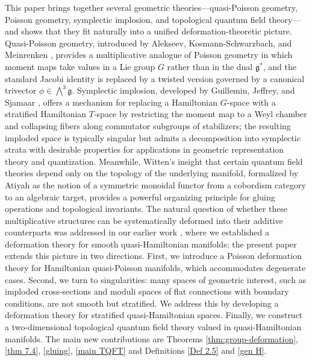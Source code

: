 \documentclass[reqno]{amsart}
\theoremstyle{plain}
\theoremstyle{definition}
\newcommand{\g}{\mathfrak{g}}
\begin{document}
This paper brings together several geometric theories---quasi-Poisson geometry, Poisson geometry, symplectic implosion, and topological quantum field theory---and shows that they fit naturally into a unified deformation-theoretic picture. Quasi-Poisson geometry, introduced by Alekseev, Kosmann-Schwarzbach, and Meinrenken \cite{alekseev2002quasi}, provides a multiplicative analogue of Poisson geometry in which moment maps take values in a Lie group $G$ rather than in the dual $\g^*$, and the standard Jacobi identity is replaced by a twisted version governed by a canonical trivector $\phi \in \bigwedge^3 \g$. Symplectic implosion, developed by Guillemin, Jeffrey, and Sjamaar \cite{guillemin2002}, offers a mechanism for replacing a Hamiltonian $G$-space with a stratified Hamiltonian $T$-space by restricting the moment map to a Weyl chamber and collapsing fibers along commutator subgroups of stabilizers; the resulting imploded space is typically singular but admits a decomposition into symplectic strata with desirable properties for applications in geometric representation theory and quantization. Meanwhile, Witten's insight \cite{witten1988} that certain quantum field theories depend only on the topology of the underlying manifold, formalized by Atiyah \cite{atiyah1988} as the notion of a symmetric monoidal functor from a cobordism category to an algebraic target, provides a powerful organizing principle for gluing operations and topological invariants. The natural question of whether these multiplicative structures can be systematically deformed into their additive counterparts was addressed in our earlier work \cite{JMM2025deformations}, where we established a deformation theory for smooth quasi-Hamiltonian manifolds; the present paper extends this picture in two directions. First, we introduce a Poisson deformation theory for Hamiltonian quasi-Poisson manifolds, which accommodates degenerate cases. Second, we turn to singularities: many spaces of geometric interest, such as imploded cross-sections and moduli spaces of flat connections with boundary conditions, are not smooth but stratified. We address this by developing a deformation theory for stratified quasi-Hamiltonian spaces. Finally, we construct a two-dimensional topological quantum field theory valued in quasi-Hamiltonian manifolds. The main new contributions are Theorems \ref{thm:group-deformation}, \ref{thm 7.4}, \ref{gluing}, \ref{main TQFT} and Definitions \ref{Def 2.5} and \ref{gen H}.
\end{document}
